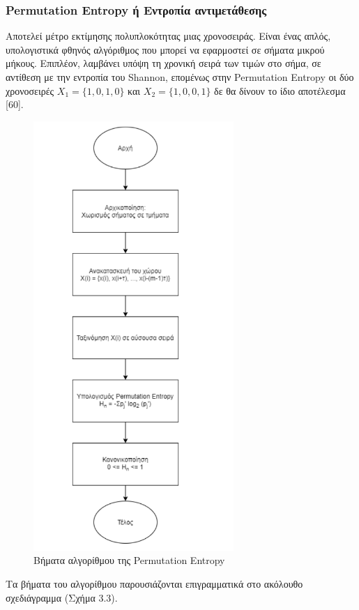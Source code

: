 \subsubsection{ \en Permutation Entropy \gr ή Εντροπία αντιμετάθεσης}
Aποτελεί μέτρο εκτίμησης πολυπλοκότητας μιας χρονοσειράς. Είναι ένας απλός, υπολογιστικά φθηνός αλγόριθμος που μπορεί να εφαρμοστεί σε σήματα μικρού μήκους. Επιπλέον, λαμβάνει υπόψη τη χρονική σειρά των τιμών στο σήμα, σε αντίθεση με την εντροπία του \en Shannon, \gr επομένως στην \en Permutation Entropy \gr οι δύο χρονοσειρές $X_1 = \{1, 0, 1, 0\}$ και $X_2 = \{1, 0, 0, 1\}$ δε θα δίνουν το ίδιο αποτέλεσμα [60]. 
\par
\begin{figure}[!ht]
	\centering
	\includegraphics{Permutation.png}    \caption{Βήματα αλγορίθμου της \en Permutation Entropy\gr }
\end{figure}
\par
Τα βήματα του αλγορίθμου παρουσιάζονται επιγραμματικά στο ακόλουθο σχεδιάγραμμα (Σχήμα 3.3). 

